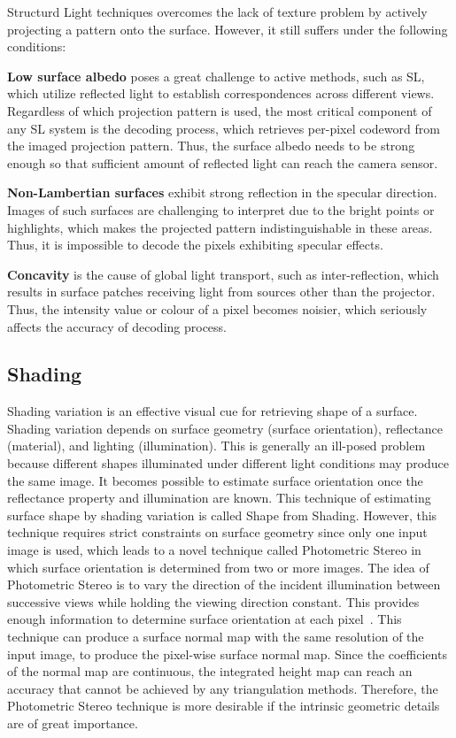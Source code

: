 Structurd Light techniques overcomes the lack of texture problem by actively projecting a pattern onto the surface. However, it still suffers under the following conditions:

\textbf{Low surface albedo} poses a great challenge to active methods, such as SL, which utilize reflected light to establish correspondences across different views. Regardless of which projection pattern is used, the most critical component of any SL system is the decoding process, which retrieves per-pixel codeword from the imaged projection pattern. Thus, the surface albedo needs to be strong enough so that sufficient amount of reflected light can reach the camera sensor.

\textbf{Non-Lambertian surfaces} exhibit strong reflection in the specular direction. Images of such surfaces are challenging to interpret due to the bright points or highlights, which makes the projected pattern indistinguishable in these areas. Thus, it is impossible to decode the pixels exhibiting specular effects.

\textbf{Concavity} is the cause of global light transport, such as inter-reflection, which results in surface patches receiving light from sources other than the projector. Thus, the intensity value or colour of a pixel becomes noisier, which seriously affects the accuracy of decoding process.

\subsection{Shading}
Shading variation is an effective visual cue for retrieving shape of a surface. Shading variation depends on surface geometry (surface orientation), reflectance (material), and lighting (illumination). This is generally an ill-posed problem because different shapes illuminated under different light conditions may produce the same image. It becomes possible to estimate surface orientation once the reflectance property and illumination are known. This technique of estimating surface shape by shading variation is called Shape from Shading. However, this technique requires strict constraints on surface geometry since only one input image is used, which leads to a novel technique called Photometric Stereo in which surface orientation is determined from two or more images. The idea of Photometric Stereo is to vary the direction of the incident illumination between successive views while holding the viewing direction constant. This provides enough information to determine surface orientation at each pixel~\cite{woodham1979photometric}. This technique can produce a surface normal map with the same resolution of the input image, \ie to produce the pixel-wise surface normal map. Since the coefficients of the normal map are continuous, the integrated height map can reach an accuracy that cannot be achieved by any triangulation methods. Therefore, the Photometric Stereo technique is more desirable if the intrinsic geometric details are of great importance.

